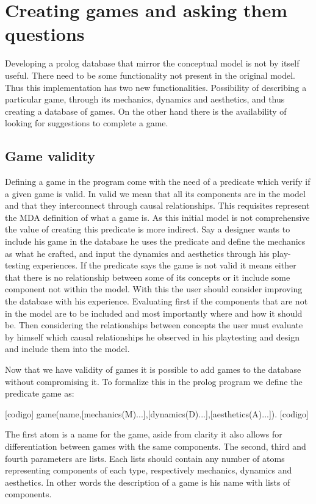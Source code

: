 \section{Creating games and asking them questions}

Developing a prolog database that mirror the conceptual model is not by itself useful. There need to be some functionality not present in the original model. Thus this implementation has two new functionalities. Possibility of describing a particular game, through its mechanics, dynamics and aesthetics, and thus creating a database of games. On the other hand there is the availability of looking for suggestions to complete a game. 

\subsection{Game validity}

Defining a game in the program come with the need of a predicate which verify if a given game is valid. In valid we mean that all its components are in the model and that they interconnect through causal relationships. This requisites represent the MDA definition of what a game is. As this initial model is not comprehensive the value of creating this predicate is more indirect. Say a designer wants to include his game in the database he uses the predicate and define the mechanics as what he crafted, and input the dynamics and aesthetics through his play-testing experiences. If the predicate says the game is not valid it means either that there is no relationship between some of its concepts or it include some component not within the model. With this the user should consider improving the database with his experience. Evaluating first if the components that are not in the model are to be included and most importantly where and how it should be. Then considering the relationships between concepts the user must evaluate by himself which causal relationships he observed in his playtesting and design and include them into the model.

Now that we have validity of games it is possible to add games to the database without compromising it. To formalize this in the prolog program we define the predicate game as:

[codigo] game(name,[mechanics(M)...],[dynamics(D)...],[aesthetics(A)...]). [codigo]

The first atom is a name for the game, aside from clarity it also allows for differentiation between games with the same components. The second, third and fourth parameters are lists. Each lists should contain any number of atoms representing components of each type, respectively mechanics, dynamics and aesthetics. In other words the description of a game is his name with lists of components.

